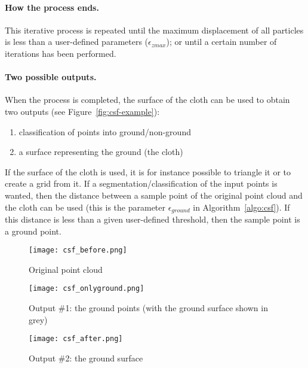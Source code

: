 
\paragraph{How the process ends.}
This iterative process is repeated until the maximum displacement of all particles is less than a user-defined parameters ($\epsilon_{zmax}$); or until a certain number of iterations has been performed.

%

\paragraph{Two possible outputs.}
When the process is completed, the surface of the cloth can be used to obtain two outputs (see Figure~\ref{fig:csf-example}):
\begin{enumerate}
  \item classification of points into ground/non-ground
  \item a surface representing the ground (the cloth)
\end{enumerate}
If the surface of the cloth is used, it is for instance possible to triangle it or to create a grid from it.
If a segmentation/classification of the input points is wanted, then the distance between a sample point of the original point cloud and the cloth can be used (this is the parameter $\epsilon_{ground}$ in Algorithm~\ref{algo:csf}).
If this distance is less than a given user-defined threshold, then the sample point is a ground point.
\begin{figure*}
  \centering
  \begin{subfigure}[b]{0.8\linewidth}
    \centering
    \texttt{[image: csf\_before.png]}
    \caption{Original point cloud}
  \end{subfigure}
  \begin{subfigure}[b]{0.8\linewidth}
    \centering
    \texttt{[image: csf\_onlyground.png]}
    \caption{Output \#1: the ground points (with the ground surface shown in grey)}
  \end{subfigure}
  \begin{subfigure}[b]{0.8\linewidth}
    \centering
    \texttt{[image: csf\_after.png]}
    \caption{Output \#2: the ground surface}
  \end{subfigure}
\caption{Two outputs of the CSF algorithm for a given area.}%
\label{fig:csf-example}
\end{figure*}

